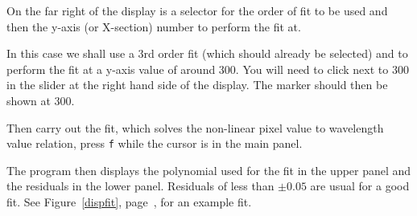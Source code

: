 \documentclass[twoside,11pt]{starlink}
\providecommand{\scspec}[2]{#1}
\begin{document}
On the far right of the display is a selector for the order of fit to be used
and then the y-axis (or X-section) number to perform the fit at.

In this case we shall use a 3rd order fit (which should already be
selected) and to perform the fit at a y-axis value of around 300. You
will need to click next to 300 in the slider at the right hand side of
the display. The marker should then be shown at 300.

Then carry out the fit, which solves the non-linear pixel value to
wavelength value relation, press \texttt{f} while the cursor is in the
main panel.

The program then displays the polynomial used for the fit in the upper
panel and the residuals in the lower panel. Residuals of less than
$\pm0.05$ are usual for a good fit. See \scspec{Figure~\ref{dispfit},
page~\pageref{dispfit},}{the figure below} for an example fit.
\end{document}
